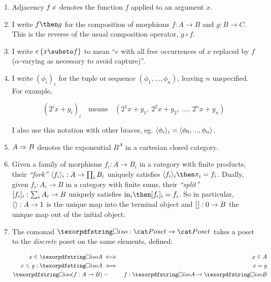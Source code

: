\begin{enumerate}
\item Adjacency $f\<x$ denotes the function $f$ applied to an argument $x$.

\item I write $f \then g$ for the composition of morphisms $f : A \to B$ and $g
  : B \to C$. This is the reverse of the usual composition operator, $g \circ
  f$.

\item I write $\subst{e}{x \substo f}$ to mean ``$e$ with all free occurrences of $x$
  replaced by $f$ ($\alpha$-varying as necessary to avoid capture)''.

  \newcommand\iexpr{\phi}
\item I write $(\iexpr_i)_i$ for the tuple or sequence $(\iexpr_1,
  ..., \iexpr_n)$, leaving $n$ unspecified. For example,

  \nopagebreak[2]
  \[ (2^ix + y_i)_i \quad\text{means}\quad
  (2^1x + y_1,~ 2^2x + y_2,~ ...,~ 2^nx + y_n) \]

  \noindent
  I also use this notation with other braces, eg. $\fork{\iexpr_i}_i =
  \fork{\iexpr_0, ..., \iexpr_n}$.

\item $A \Rightarrow B$ denotes the exponential $B^A$ in a cartesian closed category.

\item Given a family of morphisms $f_i : A \to B_i$ in a category with finite
  products, their \emph{``fork''} $\langle{f_i}\rangle_i : A \to \textstyle\prod_{i} B_i$
  uniquely satisfies $\fork{f_i}_i \then \pi_i = f_i$. Dually, given $f_i : A_i
  \to B$ in a category with finite sums, their \emph{``split''} $[{f_i}]_i :
  \sum_i A_i \to B$ uniquely satisfies $\injc_i \then \krof{f_i}_i = f_i$.
  So in particular, $\langle{}\rangle : A \to 1$ is the unique map into the terminal
  object and $[{\kern .08em}] : 0 \to B$ the unique map out of the initial object.

\item The comonad $\iso : \Poset \to \Poset$ takes a poset to the
  \emph{discrete} poset on the same elements, defined:

  \begin{eqnarray*}
    x \in \isof A &\iff& x \in A\\
    x \le y : \isof A &\iff& x = y\\
    \isof(f : A \to B) &=& f : \isof A \to \isof B
  \end{eqnarray*}
\end{enumerate}

